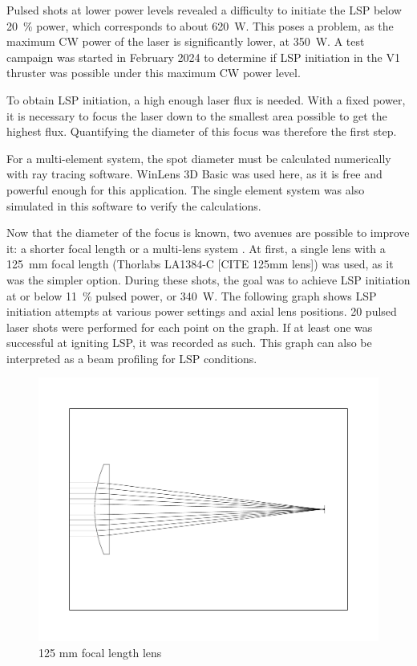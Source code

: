         Pulsed shots at lower power levels revealed a difficulty to initiate the LSP below \qty{20}{\%} power, which corresponds to about \qty{620}{W}. This poses a problem, as the maximum CW power of the laser is significantly lower, at \qty{350}{W}. A test campaign was started in February 2024 to determine if LSP initiation in the V1 thruster was possible under this maximum CW power level.
        
        To obtain LSP initiation, a high enough laser flux is needed. With a fixed power, it is necessary to focus the laser down to the smallest area possible to get the highest flux. Quantifying the diameter of this focus was therefore the first step. 


        For a multi-element system, the spot diameter must be calculated numerically with ray tracing software. WinLens 3D Basic \cite{QioptiqQShopFree} was used here, as it is free and powerful enough for this application. The single element system was also simulated in this software to verify the calculations.

        Now that the diameter of the focus is known, two avenues are possible to improve it: a shorter focal length or a multi-lens system \cite{LensTutorial}. At first, a single lens with a \qty{125}{mm} focal length (Thorlabs LA1384-C [CITE 125mm lens]) was used, as it was the simpler option. During these shots, the goal was to achieve LSP initiation at or below \qty{11}{\%} pulsed power, or \qty{340}{W}. The following graph shows LSP initiation attempts at various power settings and axial lens positions. 20 pulsed laser shots were performed for each point on the graph. If at least one was successful at igniting LSP, it was recorded as such. This graph can also be interpreted as a beam profiling for LSP conditions.
        
        \begin{figure}[!ht]
            \centering
            \includegraphics[width=\textwidth]{assets/4 experiments/125lens.pdf}
            \caption{125 mm focal length lens}
        \end{figure}

